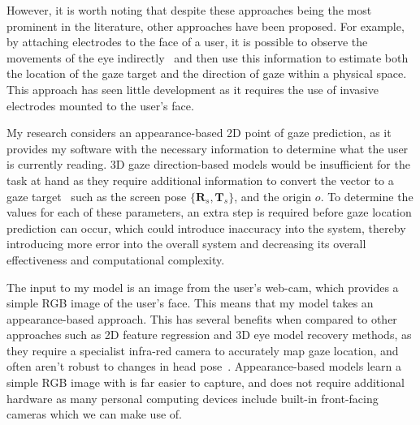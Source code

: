 \documentclass[twocolumn]{report}
\begin{document}
However, it is worth noting that despite these approaches being the most prominent in the literature, other approaches have been proposed. For example, by attaching electrodes to the face of a user, it is possible to observe the movements of the eye indirectly~\cite{young1975survey} and then use this information to estimate both the location of the gaze target and the direction of gaze within a physical space. This approach has seen little development as it requires the use of invasive electrodes mounted to the user's face. 

My research considers an appearance-based 2D point of gaze prediction, as it provides my software with the necessary information to determine what the user is currently reading. 3D gaze direction-based models would be insufficient for the task at hand as they require additional information to convert the vector to a gaze target~\cite{cheng2021survey} such as the screen pose \(\{\pmb R_s, \pmb T_s\}\), and the origin \(o\). To determine the values for each of these parameters, an extra step is required before gaze location prediction can occur, which could introduce inaccuracy into the system, thereby introducing more error into the overall system and decreasing its overall effectiveness and computational complexity.  

The input to my model is an image from the user's web-cam, which provides a simple RGB image of the user's face. This means that my model takes an appearance-based approach. This has several benefits when compared to other approaches such as 2D feature regression and 3D eye model recovery methods, as they require a specialist infra-red camera to accurately map gaze location, and often aren't robust to changes in head pose~\cite{zhu2006nonlinear}. Appearance-based models learn a simple RGB image with is far easier to capture, and does not require additional hardware as many personal computing devices include built-in front-facing cameras which we can make use of. 


\end{document}
